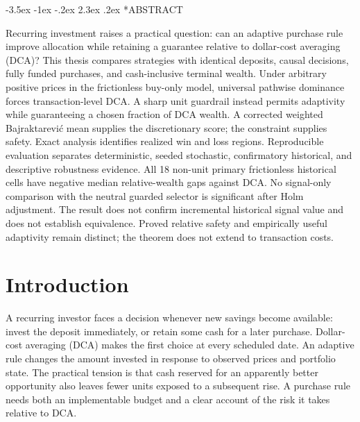 \documentclass[12pt,a4paper,oneside]{report}
\makeatletter
\renewcommand\section{\@startsection{section}{1}{\z@}%
  {-3.5ex \@plus -1ex \@minus -.2ex}%
  {2.3ex \@plus .2ex}%
  {\normalfont\fontsize{14}{17}\selectfont\bfseries}}
\makeatother
\begin{document}
\hypersetup{pageanchor=true}
\tableofcontents
\clearpage

\section*{ABSTRACT}
\label{sec:abstract}
Recurring investment raises a practical question: can an adaptive purchase
rule improve allocation while retaining a guarantee relative to dollar-cost
averaging (DCA)? This thesis compares strategies with identical deposits,
causal decisions, fully funded purchases, and cash-inclusive terminal wealth.
Under arbitrary positive prices in the frictionless buy-only model, universal
pathwise dominance forces transaction-level DCA. A sharp unit guardrail instead
permits adaptivity while guaranteeing a chosen fraction of DCA wealth. A
corrected weighted Bajraktarevi\'c mean supplies the discretionary score; the
constraint supplies safety. Exact analysis identifies realized win and loss
regions. Reproducible evaluation separates deterministic, seeded stochastic,
confirmatory historical, and descriptive robustness evidence. All 18 non-unit
primary frictionless historical cells have negative median relative-wealth
gaps against DCA. No signal-only comparison with the neutral guarded selector
is significant after Holm adjustment. The result does not confirm incremental
historical signal value and does not establish equivalence. Proved relative
safety and empirically useful adaptivity remain distinct; the theorem does
not extend to transaction costs.

\clearpage
{}

\chapter{Introduction}
\label{ch:introduction}

A recurring investor faces a decision whenever new savings become available:
invest the deposit immediately, or retain some cash for a later purchase.
Dollar-cost averaging (DCA) makes the first choice at every scheduled date.
An adaptive rule changes the amount invested in response to observed prices
and portfolio state. The practical tension is that cash reserved for an
apparently better opportunity also leaves fewer units exposed to a subsequent
rise. A purchase rule needs both an implementable budget and a clear account
of the risk it takes relative to DCA.
\end{document}
